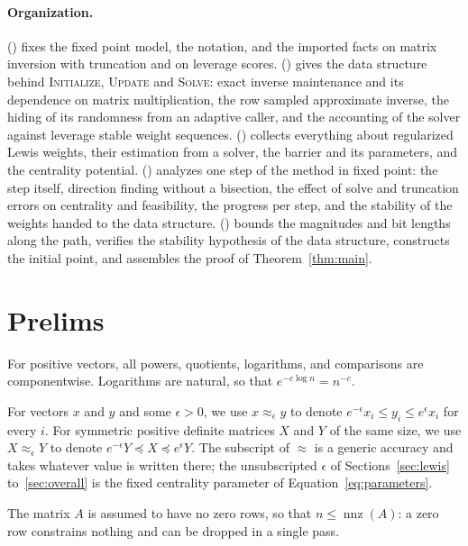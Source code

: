 \documentclass[11pt]{article}
\newcommand{\nnz}{\operatorname{nnz}}
\begin{document}
\paragraph{Organization.}
 () fixes the fixed point model, the
notation, and the imported facts on matrix inversion with truncation and on
leverage scores.
 () gives the data structure behind
\textsc{Initialize}, \textsc{Update} and \textsc{Solve}: exact inverse
maintenance and its dependence on matrix multiplication, the row sampled
approximate inverse, the hiding of its randomness from an adaptive caller, and
the accounting of the solver against leverage stable weight sequences.
 () collects everything about regularized
Lewis weights, their estimation from a solver, the barrier and its parameters,
and the centrality potential.
 ()
analyzes one step of the method in fixed point: the step itself, direction
finding without a bisection, the effect of solve and truncation errors on
centrality and feasibility, the progress per step, and the stability of the
weights handed to the data structure.
 () bounds the magnitudes and bit lengths
along the path, verifies the stability hypothesis of the data structure,
constructs the initial point, and assembles the proof of Theorem~\ref{thm:main}.

\section{Prelims}
\label{sec:prelims}

For positive vectors, all powers, quotients, logarithms, and comparisons are
componentwise.
Logarithms are natural, so that $e^{-c \log n} = n^{-c}$.

For vectors $x$ and
$y$ and some
$\epsilon > 0$, we use
$x \approx_\epsilon y$ to denote
$e^{-\epsilon} x_i \le y_i \le e^\epsilon x_i$ for every
$i$.
For symmetric positive definite matrices $X$ and
$Y$ of the same size, we use
$X \approx_\epsilon Y$ to denote
$e^{-\epsilon} Y \preceq X \preceq e^{\epsilon} Y$.
The subscript of $\approx$ is a generic accuracy and takes whatever value is
written there; the unsubscripted $\epsilon$ of Sections~\ref{sec:lewis}
to~\ref{sec:overall} is the fixed centrality parameter of
Equation~\eqref{eq:parameters}.

The matrix $A$ is assumed to have no zero rows, so that
$n \le \nnz(A)$: a zero row constrains nothing and can be dropped in a single
pass.
\end{document}

